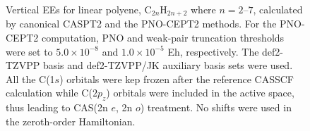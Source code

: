 \documentclass[aip,jcp,amsmath]{revtex4-1}
\begin{document}
\clearpage

{
  \begin{figure}[H]
    \caption{\label{fig:Polyene}
      {
        Vertical EEs for linear polyene, C${}_{2n}$H${}_{2n+2}$ where $n=2$--$7$, calculated by canonical CASPT2 and the PNO-CEPT2 methods.
        For the PNO-CEPT2 computation, PNO and weak-pair truncation thresholds were set to $5.0\times 10^{-8}$ and $1.0\times 10^{-5}$ Eh, respectively.
        The def2-TZVPP basis and def2-TZVPP/JK auxiliary basis sets were used.
        All the C(1$s$) orbitals were kep frozen after the reference CASSCF calculation while C($2p_z$) orbitals were included in the active space, thus leading to CAS(2n $e$, 2n $o$) treatment.
        No shifts were used in the zeroth-order Hamiltonian.
      }
    }
  \end{figure}
}

\end{document}
